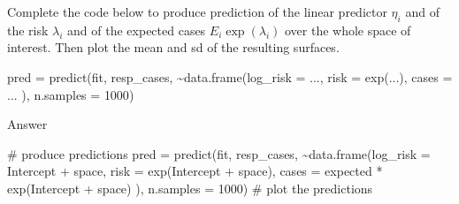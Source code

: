 \documentclass[
  letterpaper,
  DIV=11,
  numbers=noendperiod]{scrartcl}
\newenvironment{Shaded}{\begin{snugshade}}{\end{snugshade}}
\newcommand{\AttributeTok}[1]{\textcolor[rgb]{0.40,0.45,0.13}{#1}}
\newcommand{\CommentTok}[1]{\textcolor[rgb]{0.37,0.37,0.37}{#1}}
\newcommand{\DecValTok}[1]{\textcolor[rgb]{0.68,0.00,0.00}{#1}}
\newcommand{\FunctionTok}[1]{\textcolor[rgb]{0.28,0.35,0.67}{#1}}
\newcommand{\NormalTok}[1]{\textcolor[rgb]{0.00,0.23,0.31}{#1}}
\newcommand{\OtherTok}[1]{\textcolor[rgb]{0.00,0.23,0.31}{#1}}
\newcommand{\SpecialCharTok}[1]{\textcolor[rgb]{0.37,0.37,0.37}{#1}}
\begin{document}
\begin{tcolorbox}[enhanced jigsaw, opacityback=0, bottomtitle=1mm, opacitybacktitle=0.6, titlerule=0mm, left=2mm, bottomrule=.15mm, colframe=quarto-callout-warning-color-frame, rightrule=.15mm, toprule=.15mm, title={Task}, colbacktitle=quarto-callout-warning-color!10!white, leftrule=.75mm, colback=white, breakable, arc=.35mm, toptitle=1mm, coltitle=black]

Complete the code below to produce prediction of the linear predictor
\(\eta_i\) and of the risk \(\lambda_i\) and of the expected cases
\(E_i\exp(\lambda_i)\) over the whole space of interest. Then plot the
mean and sd of the resulting surfaces.

\begin{Shaded}
\begin{Highlighting}[]
\NormalTok{pred }\OtherTok{=} \FunctionTok{predict}\NormalTok{(fit, resp\_cases, }\SpecialCharTok{\textasciitilde{}}\FunctionTok{data.frame}\NormalTok{(}\AttributeTok{log\_risk =}\NormalTok{ ...,}
                                             \AttributeTok{risk =} \FunctionTok{exp}\NormalTok{(...),}
                                             \AttributeTok{cases =}\NormalTok{ ...}
\NormalTok{                                             ),}
               \AttributeTok{n.samples =} \DecValTok{1000}\NormalTok{)}
\end{Highlighting}
\end{Shaded}

Answer

\begin{Shaded}
\begin{Highlighting}[]
\CommentTok{\# produce predictions}
\NormalTok{pred }\OtherTok{=} \FunctionTok{predict}\NormalTok{(fit, resp\_cases, }\SpecialCharTok{\textasciitilde{}}\FunctionTok{data.frame}\NormalTok{(}\AttributeTok{log\_risk =}\NormalTok{ Intercept }\SpecialCharTok{+}\NormalTok{ space,}
                                             \AttributeTok{risk =} \FunctionTok{exp}\NormalTok{(Intercept }\SpecialCharTok{+}\NormalTok{ space),}
                                             \AttributeTok{cases =}\NormalTok{ expected }\SpecialCharTok{*} \FunctionTok{exp}\NormalTok{(Intercept }\SpecialCharTok{+}\NormalTok{ space)}
\NormalTok{                                             ),}
               \AttributeTok{n.samples =} \DecValTok{1000}\NormalTok{)}
\CommentTok{\# plot the predictions}


\end{Highlighting}
\end{Shaded}
\end{tcolorbox}
\end{document}
